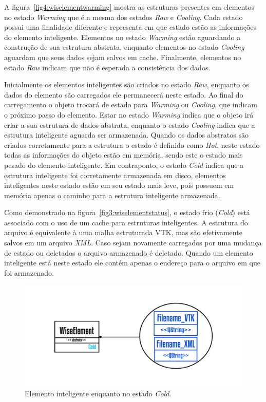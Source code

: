 \documentclass[a4paper,12pt]{monografia}
\theoremstyle{plain}
\theoremstyle{definition}
\theoremstyle{remark}
\begin{document}
A figura~\ref{fig4:wiselementwarming} mostra as estruturas presentes em elementos no estado \textit{Warming} que é a mesma dos estados \textit{Raw} e \textit{Cooling}. Cada estado possui uma finalidade diferente e representa em que estado estão as informações do elemento inteligente. Elementos no estado \textit{Warming} estão aguardando a construção de sua estrutura abstrata, enquanto elementos  no estado \textit{Cooling} aguardam que seus dados sejam salvos em cache. Finalmente, elementos no estado \textit{Raw} indicam que não é esperada a consistência dos dados.

Inicialmente os elementos inteligentes são criados no estado \textit{Raw}, enquanto os dados do elemento são carregados ele permanecerá neste estado. Ao final do carregamento o objeto trocará de estado para \textit{Warming} ou \textit{Cooling}, que indicam o próximo passo do elemento. Estar no estado \textit{Warming} indica que o objeto irá criar a sua estrutura de dados abstrata, enquanto o estado \textit{Cooling} indica que a estrutura inteligente aguarda ser armazenada. Quando os dados abstratos são criados corretamente para a estrutura o estado é definido como \textit{Hot}, neste estado todas as informações do objeto estão em memória, sendo este o estado mais pesado do elemento inteligente. Em contraponto, o estado \textit{Cold} indica que a estrutura inteligente foi corretamente armazenada em disco, elementos inteligentes neste estado estão em seu estado mais leve, pois possuem em memória apenas o caminho para a estrutura inteligente armazenada.

Como demonstrado na figura~\ref{fig3:wiselementstatus}, o estado frio (\textit{Cold}) está associado com o uso de um cache para estruturas inteligentes. A estrutura do arquivo é equivalente à uma malha estruturada VTK, mas são efetivamente salvos em um arquivo \textit{XML}. Caso sejam novamente carregados por uma mudança de estado ou deletados o arquivo armazenado é deletado. Quando um elemento inteligente está neste estado ele contém apenas o endereço para o arquivo em que foi armazenado.

\begin{figure}[!htbp]
	\centering
	\includegraphics[scale=1]{Figures/WiseElementCold.png}
	\caption{Elemento inteligente enquanto no estado \textit{Cold}.}
	\label{fig5:wiselementcold}
\end{figure}
\end{document}
